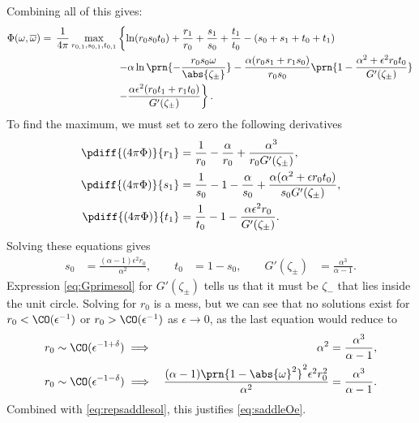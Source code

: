 \documentclass[12pt]{article}
\newcommand{\inv}{^{-1}}
\newcommand{\omb}{\overline{\omega}}
\newcommand{\omo}{\prn{1-\abs{\omega}^2}}
\begin{document}
Combining all of this gives:
%
\begin{equation}\label{eq:phimaxrep}
\begin{aligned}
  \Phi(\omega,\omb) =\, \frac{1}{4\pi} \max_{r_{0,1},s_{0,1},t_{0,1}}& \left\{
    \ln(r_0s_0t_0) + \frac{r_1}{r_0} + \frac{s_1}{s_0} + \frac{t_1}{t_0}
    -(s_0 + s_1 + t_0 + t_1)
    \right.\\&\left.
    - \alpha\ln\prn{-\frac{r_0s_0\omega}{\abs{\zeta_\pm}}}
    - \frac{\alpha(r_0s_1+r_1s_0)}{r_0s_0}\prn{1-\frac{\alpha^2+\epsilon^2r_0t_0} {G'(\zeta_\pm)}}
    \right.\\&\left.
    - \frac{ \alpha\epsilon^2 (r_0t_1+r_1t_0)} {G'(\zeta_\pm)}
    \right\}.
\end{aligned}
\end{equation}
%
To find the maximum, we must set to zero the following derivatives
%
\begin{equation}\label{eq:phidiff1}
\begin{aligned}
  \pdiff{(4\pi\Phi)}{r_1} &= \frac{1}{r_0} - \frac{\alpha}{r_0} + \frac{\alpha^3}{r_0G'(\zeta_\pm)},  \\
  \pdiff{(4\pi\Phi)}{s_1} &= \frac{1}{s_0} - 1 - \frac{\alpha}{s_0} + \frac{\alpha(\alpha^2+\epsilon r_0 t_0 )}{s_0G'(\zeta_\pm)},  \\
  \pdiff{(4\pi\Phi)}{t_1} &= \frac{1}{t_0} - 1 - \frac{\alpha\epsilon^2r_0}{G'(\zeta_\pm)}.
\end{aligned}
\end{equation}
%
Solving these equations gives
%
\begin{equation}\label{eq:repsaddlesol}
\begin{aligned}
  s_0 &= \frac{(\alpha-1)\epsilon^2r_0}{\alpha^2}, \qquad
  t_0 &= 1 - s_0,\qquad
  G'(\zeta_\pm) &= \frac{\alpha^3}{\alpha-1}.
\end{aligned}
\end{equation}
%
Expression \eqref{eq:Gprimesol} for $G'(\zeta_\pm)$ tells us that it must be $\zeta_-$ that lies inside the unit circle.
Solving for $r_0$ is a mess, but we can see that no solutions exist for $r_0<\CO(\epsilon\inv)$ or $r_0>\CO(\epsilon\inv)$ as $\epsilon\to0$, as the last equation would reduce to
\begin{equation}\label{eq:rOe}
\begin{aligned}
  r_0 &\sim \CO(\epsilon^{-1+\delta})
   \implies &
   \alpha^2 &= \frac{\alpha^3}{\alpha-1}, \\
  r_0 &\sim \CO(\epsilon^{-1-\delta})
   \implies &
   \frac{(\alpha-1)\omo^2\epsilon^2r_0^2}{\alpha^2} &= \frac{\alpha^3}{\alpha-1}. \\
\end{aligned}
\end{equation}
%
Combined with \eqref{eq:repsaddlesol}, this justifies \eqref{eq:saddleOe}.
\end{document}

